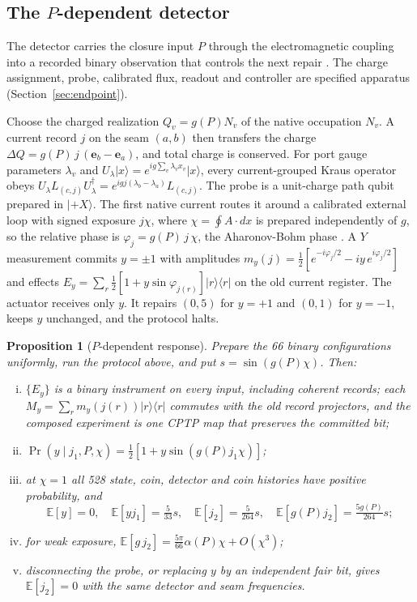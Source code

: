 \documentclass[11pt]{article}
\newtheorem{proposition}[theorem]{Proposition}
\theoremstyle{definition}
\theoremstyle{remark}
\theoremstyle{plain}
\newcommand{\ket}[1]{\lvert #1\rangle}
\newcommand{\proj}[1]{\lvert #1\rangle\langle #1\rvert}
\newcommand{\Ex}{\mathbb{E}}
\begin{document}
\subsection{The \texorpdfstring{$P$}{P}-dependent detector}
\label{sec:p-detector}

The detector carries the closure input $P$ through the electromagnetic
coupling into a recorded binary observation that controls the next repair
\cite{pREADME,pDERIV}. The charge assignment, probe, calibrated flux, readout
and controller are specified apparatus (Section~\ref{sec:endpoint}).

Choose the charged realization $Q_v=g(P)N_v$ of the native occupation $N_v$.
A current record $j$ on the seam $(a,b)$ then transfers the charge
$\Delta Q=g(P)\,j\,(\mathbf e_b-\mathbf e_a)$, and total charge is conserved.
For port gauge parameters $\lambda_v$ and
$U_\lambda\ket{x}=e^{ig\sum_v\lambda_vx_v}\ket{x}$, every current-grouped
Kraus operator obeys
$U_\lambda L_{(c,j)}U_\lambda^\dagger=e^{igj(\lambda_b-\lambda_a)}L_{(c,j)}$.
The probe is a unit-charge path qubit prepared in $\ket{+X}$. The first
native current routes it around a calibrated external loop with signed
exposure $j\chi$, where $\chi=\oint A\cdot dx$ is prepared independently of
$g$, so the relative phase is $\varphi_j=g(P)\,j\,\chi$, the Aharonov-Bohm
phase \cite{aharonov1959}. A $Y$ measurement commits $y=\pm1$ with amplitudes
$m_y(j)=\frac12[e^{-i\varphi_j/2}-iy\,e^{i\varphi_j/2}]$ and effects
$E_y=\sum_r\frac12[1+y\sin\varphi_{j(r)}]\proj{r}$ on the old current
register. The actuator receives only $y$. It repairs $(0,5)$ for $y=+1$ and
$(0,1)$ for $y=-1$, keeps $y$ unchanged, and the protocol halts.

\begin{proposition}[$P$-dependent response]
\label{prop:p-response}
Prepare the 66 binary configurations uniformly, run the protocol above, and
put $s=\sin(g(P)\chi)$. Then:
\begin{enumerate}[(i)]
\item $\{E_y\}$ is a binary instrument on every input, including coherent
records; each $M_y=\sum_rm_y(j(r))\proj r$ commutes with the old record
projectors, and the composed experiment is one CPTP map that preserves the
committed bit;
\item $\Pr(y\mid j_1,P,\chi)=\frac12[1+y\sin(g(P)j_1\chi)]$;
\item at $\chi=1$ all 528 state, coin, detector and coin histories have
positive probability, and
\[
\Ex[y]=0,\quad \Ex[yj_1]=\tfrac{5}{33}s,\quad
\Ex[j_2]=\tfrac{5}{264}s,\quad \Ex[g(P)j_2]=\tfrac{5g(P)}{264}s;
\]
\item for weak exposure, $\Ex[g\,j_2]=\frac{5\pi}{66}\alpha(P)\chi+O(\chi^3)$;
\item disconnecting the probe, or replacing $y$ by an independent fair bit,
gives $\Ex[j_2]=0$ with the same detector and seam frequencies.
\end{enumerate}
\end{proposition}
\end{document}
